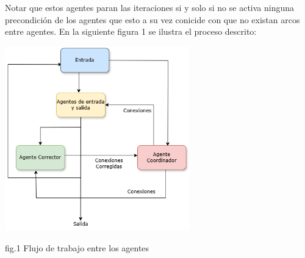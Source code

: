         Notar que estos agentes paran las iteraciones si y solo si no se activa ninguna precondición de los agentes que esto a su vez conicide con que no existan arcos entre agentes. En la siguiente figura 1 se ilustra el proceso descrito: \\


        \begin{center}
                \includegraphics[width=0.6\textwidth]{images/AgentArchitecture.drawio.png}
                \begin{center}
                    fig.1 Flujo de trabajo entre los agentes
                \end{center}
        \end{center}